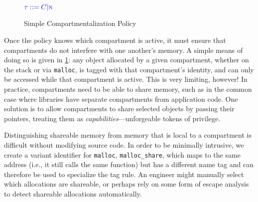 \documentclass{llncs}
\begin{document}
\begin{figure}[t]
  \color{blue}
  \begin{minipage}[t]{0.3\textwidth}
    \vspace{-2em}
    \(\color{blue} \tau ::= C | \textnormal{\color{blue} \sc n}\)

  
  \end{minipage}
  \scriptsize
  \begin{minipage}[t]{0.25\textwidth}
    \malloctruleblock{\(\PCT['] := \PCT; \pt['] := \N;\) \\ \(\vt['] := \N; \lt['] := \PCT\)}
    \localtruleblock{\(\PCT['] := \PCT; \pt['] := \N;\) \\ \(\vt['] := \N; \lt['] := \PCT\)}
  \end{minipage}
  \begin{minipage}[t]{0.25\textwidth}
    
  \end{minipage}
    
  \caption{Simple Compartmentalization Policy}
  \label{fig:compartments}
\end{figure}

Once the policy knows which compartment is active, it must ensure that compartments do not interfere with
one another's memory. A simple means of doing so is given in \cref{fig:compartments}: any object allocated by
a given compartment, whether on the stack or via {\tt malloc}, is tagged with that compartment's identity,
and can only be accessed while that compartment is active.
This is very limiting, however! In practice, compartments need to be able to share memory, such as in the
common case where libraries have separate compartments from application code. One solution is to allow
compartments to share selected objects by passing their pointers, treating them as
{\em capabilities}---unforgeable tokens of privilege.

Distinguishing shareable memory from memory that is local to a compartment is difficult
without modifying source code. In order to be minimally intrusive, we
create a variant identifier for {\tt malloc}, {\tt malloc\_share}, which maps to the same
address (i.e., it still calls the same function) but has a different name tag and can therefore
be used to specialize the tag rule. An engineer might manually select which allocations are
shareable, or perhaps rely on some form of escape analysis to detect shareable allocations automatically.
\end{document}
